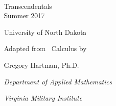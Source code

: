 


\begin{flushright}

\textsc{\large \apex\ {\Huge\thetitle}} \\

 Transcendentals \\
Summer 2017 \\

%

\Large

University of North Dakota\bigskip

\normalsize

Adapted from \apex\ Calculus by

Gregory Hartman, Ph.D.

\emph{\small Department of Applied Mathematics}

\emph{\small Virginia Military Institute}

\end{flushright}
\normalsize
{}
\restoregeometry
